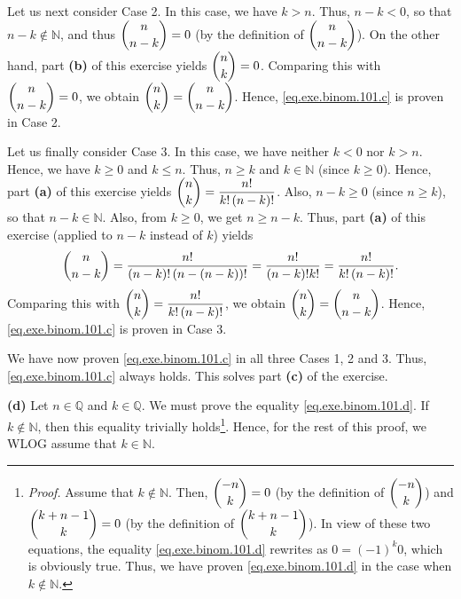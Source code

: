 \documentclass[paper=a4, fontsize=12pt]{scrartcl} %
\newcommand{\QQ}{\mathbb{Q}} %
\newcommand{\NN}{\mathbb{N}} %
\newcommand{\tup}[1]{\left( #1 \right)}
\theoremstyle{plainsl}
\theoremstyle{definition}
\theoremstyle{remark}
\begin{document}
Let us next consider Case 2.
In this case, we have $k > n$.
Thus, $n-k < 0$, so that $n-k \notin \NN$, and thus
$\dbinom{n}{n-k} = 0$
(by the definition of $\dbinom{n}{n-k}$).
On the other hand, part \textbf{(b)} of this exercise
yields $\dbinom{n}{k} = 0$.
Comparing this with $\dbinom{n}{n-k} = 0$, we obtain
$\dbinom{n}{k} = \dbinom{n}{n-k}$.
Hence, \eqref{eq.exe.binom.101.c} is proven in Case 2.

Let us finally consider Case 3.
In this case, we have neither $k < 0$ nor $k > n$.
Hence, we have $k \geq 0$ and $k \leq n$.
Thus, $n \geq k$ and $k \in \NN$ (since $k \geq 0$).
Hence, part \textbf{(a)} of this exercise
yields $\dbinom{n}{k} = \dfrac{n!}{k! \tup{n-k}!}$.
Also, $n-k \geq 0$ (since $n \geq k$), so that
$n-k \in \NN$. Also, from $k \geq 0$, we get $n \geq n-k$.
Thus, part \textbf{(a)} of this exercise (applied to $n-k$
instead of $k$) yields
\[
\dbinom{n}{n-k} = \dfrac{n!}{\tup{n-k}! \tup{n-\tup{n-k}}!}
= \dfrac{n!}{\tup{n-k}! k!} = \dfrac{n!}{k! \tup{n-k}!} .
\]
Comparing this with $\dbinom{n}{k} = \dfrac{n!}{k! \tup{n-k}!}$,
we obtain $\dbinom{n}{k} = \dbinom{n}{n-k}$.
Hence, \eqref{eq.exe.binom.101.c} is proven in Case 3.

We have now proven \eqref{eq.exe.binom.101.c} in all three
Cases 1, 2 and 3. Thus, \eqref{eq.exe.binom.101.c} always holds.
This solves part \textbf{(c)} of the exercise.

\vspace{0.8pc}

\textbf{(d)}
Let $n \in \QQ$ and $k \in \QQ$.
We must prove the equality \eqref{eq.exe.binom.101.d}.
If $k \notin \NN$, then this equality trivially
holds\footnote{\textit{Proof.} Assume that $k \notin \NN$.
Then, $\dbinom{-n}{k} = 0$ (by the definition of
$\dbinom{-n}{k}$) and $\dbinom{k + n - 1}{k} = 0$
(by the definition of $\dbinom{k + n - 1}{k}$). In view of
these two equations, the equality
\eqref{eq.exe.binom.101.d} rewrites as $0 = \tup{-1}^k 0$,
which is obviously true.
Thus, we have proven \eqref{eq.exe.binom.101.d} in the case
when $k \notin \NN$.}.
Hence, for the rest of this proof, we WLOG assume that
$k \in \NN$.
\end{document}

